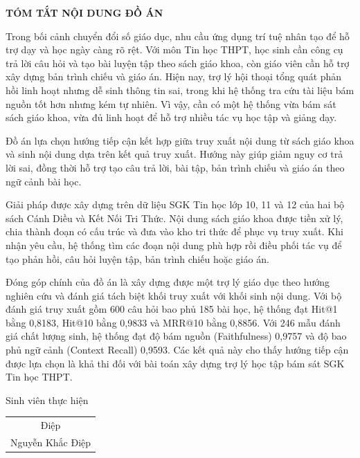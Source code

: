 \documentclass[../DoAn.tex]{subfiles}
\begin{document}
\begin{center}
    \Large{\textbf{TÓM TẮT NỘI DUNG ĐỒ ÁN}}\\
\end{center}
\vspace{1cm}
Trong bối cảnh chuyển đổi số giáo dục, nhu cầu ứng dụng trí tuệ nhân tạo để hỗ trợ dạy và học ngày càng rõ rệt. Với môn Tin học THPT, học sinh cần công cụ trả lời câu hỏi và tạo bài luyện tập theo sách giáo khoa, còn giáo viên cần hỗ trợ xây dựng bản trình chiếu và giáo án. Hiện nay, trợ lý hội thoại tổng quát phản hồi linh hoạt nhưng dễ sinh thông tin sai, trong khi hệ thống tra cứu tài liệu bám nguồn tốt hơn nhưng kém tự nhiên. Vì vậy, cần có một hệ thống vừa bám sát sách giáo khoa, vừa đủ linh hoạt để hỗ trợ nhiều tác vụ học tập và giảng dạy.

Đồ án lựa chọn hướng tiếp cận kết hợp giữa truy xuất nội dung từ sách giáo khoa và sinh nội dung dựa trên kết quả truy xuất. Hướng này giúp giảm nguy cơ trả lời sai, đồng thời hỗ trợ tạo câu trả lời, bài tập, bản trình chiếu và giáo án theo ngữ cảnh bài học.

Giải pháp được xây dựng trên dữ liệu SGK Tin học lớp 10, 11 và 12 của hai bộ sách Cánh Diều và Kết Nối Tri Thức. Nội dung sách giáo khoa được tiền xử lý, chia thành đoạn có cấu trúc và đưa vào kho tri thức để phục vụ truy xuất. Khi nhận yêu cầu, hệ thống tìm các đoạn nội dung phù hợp rồi điều phối tác vụ để tạo phản hồi, câu hỏi luyện tập, bản trình chiếu hoặc giáo án.

Đóng góp chính của đồ án là xây dựng được một trợ lý giáo dục theo hướng nghiên cứu và đánh giá tách biệt khối truy xuất với khối sinh nội dung. Với bộ đánh giá truy xuất gồm 600 câu hỏi bao phủ 185 bài học, hệ thống đạt Hit@1 bằng 0,8183, Hit@10 bằng 0,9833 và MRR@10 bằng 0,8856. Với 246 mẫu đánh giá chất lượng sinh, hệ thống đạt độ bám nguồn (Faithfulness) 0,9757 và độ bao phủ ngữ cảnh (Context Recall) 0,9593. Các kết quả này cho thấy hướng tiếp cận được lựa chọn là khả thi đối với bài toán xây dựng trợ lý học tập bám sát SGK Tin học THPT.

\begin{flushright}
Sinh viên thực hiện\\
\begin{tabular}{@{}c@{}}
Điệp\\
Nguyễn Khắc Điệp
\end{tabular}
\end{flushright}
\end{document}
